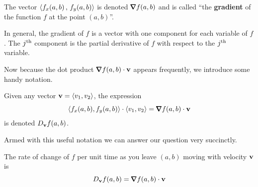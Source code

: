 \begin{defn}\label{def gradient 2d}
The vector $\left< f_x(a,b)\,,\,f_y(a,b)\right> $ is denoted $\vnabla f(a,b)$ and is
called ``the \textbf{gradient} of the function $f$ at the point $(a,b)$''.
\end{defn}
\noindent
In general, the gradient of $f$ is a vector with one component 
for each variable of $f$. The $j^{\rm th}$ component is the partial 
derivative of $f$ with respect to the $j^{\rm th}$ variable. 

Now because the dot product $\vnabla f(a,b)\cdot\vv$ appears frequently,
we introduce some handy notation.
\begin{notn}\label{def dir deriv}
Given any vector $\mathbf{v}=\left< v_1,v_2\right>$,
the expression 
\begin{equation*}
\llt f_x(a,b),f_y(a,b)\rgt \cdot\llt v_1,v_2\rgt  =\vnabla f(a,b)\cdot\vv
\end{equation*} 
is denoted $D_{\mathbf{v}}f(a,b)$.
\end{notn}\noindent
Armed with this useful notation we can answer our question very succinctly.
\begin{impeqn}\label{eqn dir deriv time}
The rate of change of $f$ per unit
time as you leave $(a,b)$ moving with velocity $\mathbf{v}$ is
$$
D_{\vv}f(a,b)=\vnabla f(a,b)\cdot\vv
$$
\end{impeqn}


